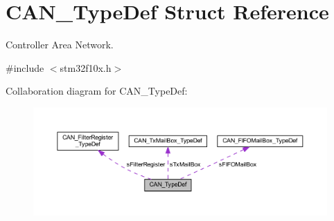 \hypertarget{struct_c_a_n___type_def}{}\section{C\+A\+N\+\_\+\+Type\+Def Struct Reference}
\label{struct_c_a_n___type_def}


Controller Area Network.  




{\ttfamily \#include $<$stm32f10x.\+h$>$}



Collaboration diagram for C\+A\+N\+\_\+\+Type\+Def\+:
\nopagebreak
\begin{figure}[H]
\begin{center}
\leavevmode
\includegraphics[width=350pt]{struct_c_a_n___type_def__coll__graph}
\end{center}
\end{figure}

